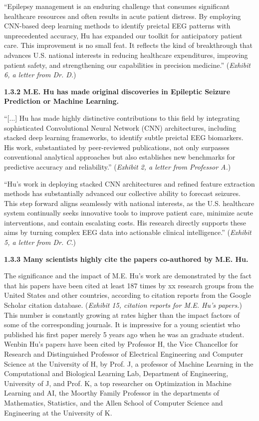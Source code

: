 \documentclass{article}
\begin{document}
“Epilepsy management is an enduring challenge that consumes significant healthcare resources and often results in acute patient distress. By employing CNN-based deep learning methods to identify preictal EEG patterns with unprecedented accuracy, Hu has expanded our toolkit for anticipatory patient care. This improvement is no small feat. It reflects the kind of breakthrough that advances U.S. national interests in reducing healthcare expenditures, improving patient safety, and strengthening our capabilities in precision medicine.” ({\it Exhibit 6, a letter from Dr. D.})

{\bf 1.3.2 M.E. Hu has made original discoveries in Epileptic Seizure Prediction or Machine Learning. }

“[...] Hu has made highly distinctive contributions to this field by integrating sophisticated Convolutional Neural Network (CNN) architectures, including stacked deep learning frameworks, to identify subtle preictal EEG biomarkers. His work, substantiated by peer-reviewed publications, not only surpasses conventional analytical approaches but also establishes new benchmarks for predictive accuracy and reliability.” ({\it Exhibit 2, a letter from Professor A.}) 

“Hu’s work in deploying stacked CNN architectures and refined feature extraction methods has substantially advanced our collective ability to forecast seizures. This step forward aligns seamlessly with national interests, as the U.S. healthcare system continually seeks innovative tools to improve patient care, minimize acute interventions, and contain escalating costs. His research directly supports these aims by turning complex EEG data into actionable clinical intelligence.” ({\it Exhibit 5, a letter from Dr. C.}) 

{\bf 1.3.3 Many scientists highly cite the papers co-authored by M.E. Hu. }

The significance and the impact of M.E. Hu’s work are demonstrated by the fact that his papers have been cited at least 187 times by xx  research groups from the United States and other countries, according to citation reports from the Google Scholar citation database. ({\it Exhibit 15, citation reports for M.E. Hu’s papers.}) This number is constantly growing at rates higher than the impact factors of some of the corresponding journals. It is impressive for a young scientist who published his first paper merely 5 years ago when he was an graduate student. Wenbin Hu’s papers have been cited by Professor H, the Vice Chancellor for Research and Distinguished Professor of Electrical Engineering and Computer Science at the University of H, by Prof. J, a professor of Machine Learning in the Computational and Biological Learning Lab, Department of Engineering, University of J, and Prof. K, a top researcher on Optimization in Machine Learning and AI, the Moorthy Family Professor in the departments of Mathematics, Statistics, and the Allen School of Computer Science and Engineering at the University of K.
\end{document}
